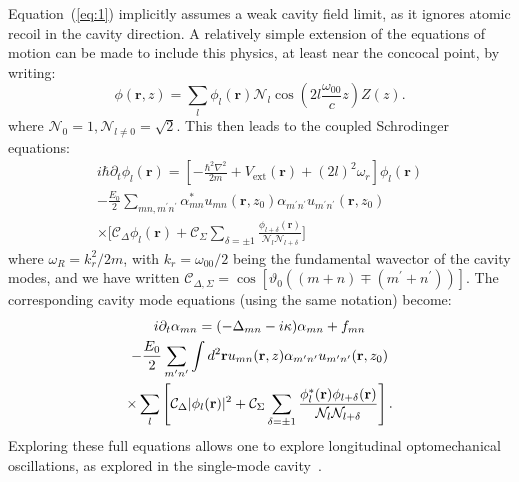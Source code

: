 \documentclass[pra,twocolumn,superscriptaddress]{revtex4-1}
\newcommand{\vect}[1]{\mathbf{#1}}
\newcommand{\transverse}{u}
\newcommand{\wf}{\phi}
\begin{document}
Equation~(\ref{eq:1}) implicitly assumes a weak cavity field limit, as
it ignores atomic recoil in the cavity direction.  A relatively simple
extension of the equations of motion can be made to include this
physics, at least near the concocal point, by writing:
\begin{displaymath}
  \wf(\vect r,z) = \sum_l \wf_l(\vect r) 
  {\mathcal{N}_l}\cos\left(2l\frac{\omega_{00}}{c} z \right) Z(z) .
\end{displaymath}
where $\mathcal{N}_0=1, \mathcal{N}_{l \neq 0}=\sqrt{2}$. This then
leads to the coupled Schrodinger equations:
\begin{multline}
  \label{eq:6}
  i \hbar \partial_t \wf_l(\vect r) =
  \left[ - \frac{\hbar^2 \nabla^2}{2m} + V_{\text{ext}}(\vect{r})
    + (2l)^2 \omega_r
  \right] \wf_l(\vect r)
  \\
  - \frac{E_0}{2}\sum_{mn,m^\prime n^\prime}
  \alpha_{mn}^\ast
  \transverse_{mn}(\vect r, z_0) 
  \alpha_{m^\prime n^\prime}
  \transverse_{m^\prime n^\prime}(\vect r, z_0) 
  \\\times  \biggl[ 
  \mathcal{C}_\Delta \wf_l(\vect r)
  +
  \mathcal{C}_\Sigma
  \sum_{\delta=\pm 1} 
  \frac{\wf_{l + \delta}(\vect r)}{\mathcal{N}_l \mathcal{N}_{l + \delta}}
  \biggr]
\end{multline}
where $\omega_R = k_r^2/2m$, with $k_r=\omega_{00}/2$ being the
fundamental wavector of the cavity modes, and we have written
$\mathcal{C}_{\Delta,\Sigma} = \cos[ \vartheta_0((m+n) \mp (m^\prime +
n^\prime))]$.  The corresponding cavity mode equations (using the same
notation) become:
\begin{multline}
  \label{eq:5}
  i \partial_t \alpha_{mn}
  = (-\Delta_{mn} -i \kappa) \alpha_{mn} 
  +
  f_{mn} 
  \\
  - \frac{E_0}{2} \sum_{m^\prime n^\prime} 
  \int d^2{\vect r} 
  \transverse_{mn}(\vect r,z)
  \alpha_{m^\prime n^\prime}
  \transverse_{m^\prime n^\prime}(\vect r,z_0)
  \\
  \times\sum_l 
  \left[    \mathcal{C}_\Delta  |\wf_l(\vect{r})|^2
  +
  \mathcal{C}_\Sigma
  \sum_{\delta=\pm 1} 
  \frac{\wf^\ast_l(\vect r)\wf_{l+\delta}(\vect r)}{%
    \mathcal{N}_l \mathcal{N}_{l + \delta}}
  \right].
\end{multline}
Exploring these full equations allows one to explore longitudinal
optomechanical oscillations, as explored in the single-mode
cavity~\cite{Brennecke:Opto}.


\end{document}

